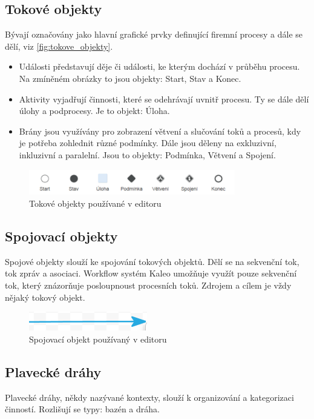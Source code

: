 \documentclass{fithesis}
\begin{document}
\subsection{Tokové objekty}
Bývají označovány jako hlavní grafické prvky definující firemní procesy a dále se dělí, viz \autoref{fig:tokove_objekty}.

\begin{itemize}
\item Události představují děje či události, ke kterým dochází v průběhu procesu. Na zmíněném obrázky to jsou objekty: Start, Stav a Konec.
\item Aktivity vyjadřují činnosti, které se odehrávají uvnitř procesu. Ty se dále dělí úlohy a podprocesy. Je to objekt: Úloha.
\item Brány jsou využívány pro zobrazení větvení a slučování toků a procesů, kdy je potřeba zohlednit různé podmínky. Dále jsou děleny na exkluzivní, inkluzivní a paralelní. Jsou to objekty: Podmínka, Větvení a Spojení.
\end{itemize}

\begin{figure}[htp]
\centering
\includegraphics[width=340px]{images/tokove_objekty.png}
\caption{Tokové objekty používané v editoru}
\label{fig:tokove_objekty}
\end{figure}

\subsection{Spojovací objekty}
Spojové objekty slouží ke spojování tokových objektů. Dělí se na sekvenční tok, tok zpráv a asociaci. Workflow systém Kaleo umožňuje využít pouze sekvenční tok, který znázorňuje posloupnoust procesních toků. Zdrojem a cílem je vždy nějaký tokový objekt.

\begin{figure}[htp]
\centering
\includegraphics{images/spoj_objekty.png}
\caption{Spojovací objekt používaný v editoru}
\end{figure}


\subsection{Plavecké dráhy}
Plavecké dráhy, někdy nazývané kontexty, slouží k organizování a kategorizaci činností. Rozlišují se typy: bazén a dráha.
\end{document}
